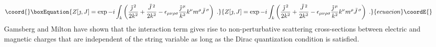 \documentclass[a4paper,a4paper]{article}
\begin{document}
\begin{equation}\coord{}\boxEquation{
\label{FinalFunctional}
Z[ \jmath, J] = \exp - i \int_k \left( \frac{\tilde{\jmath}^{\, 2}}{2k^2} + \frac{\tilde{J}^{\, 2}}{2k^2} -  \epsilon_{\mu \nu \rho \sigma} \frac{\tilde{\jmath}^{\, \mu}}{k^2} k^\nu m^\rho \tilde{J}^{\, \sigma} \right) \; .
}{
Z[ \jmath, J] = \exp - i \int_k \left( \frac{\tilde{\jmath}^{\, 2}}{2k^2} + \frac{\tilde{J}^{\, 2}}{2k^2} -  \epsilon_{\mu \nu \rho \sigma} \frac{\tilde{\jmath}^{\, \mu}}{k^2} k^\nu m^\rho \tilde{J}^{\, \sigma} \right) \; .
}{ecuacion}\coordE{}\end{equation}
Gamsberg and Milton \cite{GamsbergMilton} have shown that the interaction term \coordHE{} gives rise to non-perturbative scattering cross-sections between electric and magnetic charges that are independent of the string variable \coordHE{} as long as the Dirac quantization condition is satisfied.
\end{document}
